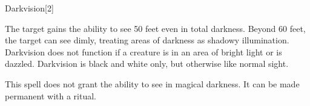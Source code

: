\begin{spellsection}{Darkvision}[2]
    \begin{spellheader}
    \end{spellheader}
    \begin{spellcontent}
        \begin{spelltargetinginfo}
        \end{spelltargetinginfo}
        \begin{spelleffects}
            \spelleffect The target gains the ability to see 50 feet even in total darkness. Beyond 60 feet, the target can see dimly, treating areas of darkness as shadowy illumination. Darkvision does not function if a creature is in an area of bright light or is dazzled. Darkvision is black and white only, but otherwise like normal sight.
            \spelldur \durlong
        \end{spelleffects}
    \end{spellcontent}
    \begin{spellfooter}
        \spellnotes This spell does not grant the ability to see in magical darkness. It can be made permanent with a  ritual.
        \miscastexplode
    \end{spellfooter}
\end{spellsection}

